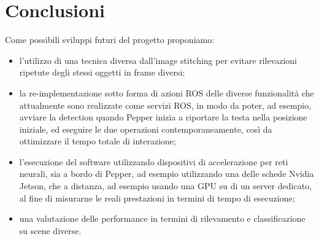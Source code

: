 \section{Conclusioni}

Come possibili sviluppi futuri del progetto proponiamo: 
\begin{itemize}
    \item l'utilizzo di una tecnica diversa dall'image stitching per evitare rilevazioni ripetute degli stessi oggetti in frame diversi;
    \item la re-implementazione sotto forma di azioni ROS delle diverse funzionalità che attualmente sono realizzate come servizi ROS, in modo da poter, ad esempio, avviare la detection quando Pepper inizia a riportare la testa nella posizione iniziale, ed eseguire le due operazioni contemporaneamente, così da ottimizzare il tempo totale di interazione;
    \item l'esecuzione del software utilizzando dispositivi di accelerazione per reti neurali, sia a bordo di Pepper, ad esempio utilizzando una delle schede Nvidia Jetson, che a distanza, ad esempio usando una GPU su di un server dedicato, al fine di misurarne le reali prestazioni in termini di tempo di esecuzione;
    \item una valutazione delle performance in termini di rilevamento e classificazione su scene diverse.
\end{itemize} 